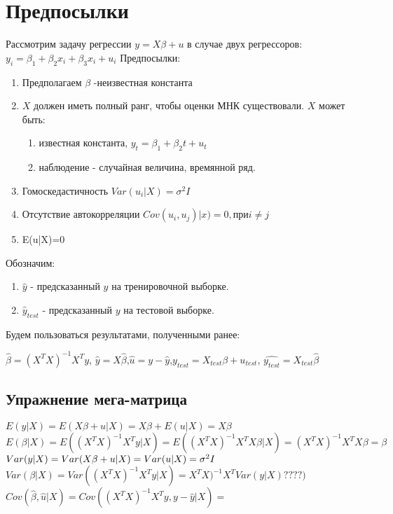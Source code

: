 \documentclass[12pt]{article} %
\theoremstyle{definition} %
\begin{document}
\section{Предпосылки}
Рассмотрим задачу регрессии $y=X\beta+u$ в случае двух регрессоров: $y_i=\beta_1+\beta_2x_i+\beta_3x_i+u_i$
Предпосылки:
\begin{enumerate}
    \item Предполагаем $\beta$ -неизвестная константа
    \item $X$ должен иметь полный ранг, чтобы оценки МНК существовали. $X$ может быть:
    \begin{enumerate}
        \item известная константа, $y_t=\beta_1+\beta_2t+u_t$
        \item наблюдение - случайная величина, времянной ряд.
    \end{enumerate}
    \item Гомоскедастичность ${Var}(u_i|X)=\sigma^2I$
    \item Отсутствие автокорреляции
    ${Cov}(u_i,u_j)|x)=0, при i\neq j$
    \item {E}(u|X)=0
\end{enumerate}
Обозначим:
\begin{enumerate}
    \item $\hat{y}$ - предсказанный $y$ на тренировочной выборке.
    \item $\hat{y}_{test}$ - предсказанный $y$ на тестовой выборке.
\end{enumerate}
\newpage
Будем пользоваться результатами, полученными ранее:

$\hat\beta=(X^TX)^{-1}X^Ty$,
$\hat{y}=X\hat\beta$,$\hat{u}=y-\hat{y}$,$y_{test}=X_{test}\beta+u_{test}$,
$\hat{y_{test}}=X_{test}\hat{\beta}$
\subsection{Упражнение мега-матрица}
${E}(y|X)={E}(X\beta+u|X)=X\beta+{E}(u|X)=X\beta$\\
${E}(\beta|X)={E}((X^TX)^{-1}X^Ty|X)={E}((X^TX)^{-1}X^TX\beta|X)=(X^TX)^{-1}X^TX\beta=\beta$\\
${Var}(y|X)={Var}(X\beta+u|X)={Var}(u|X)=\sigma^2I\\$
${Var}(\beta|X)={Var}((X^TX)^{-1}X^Ty|X)=X^TX)^{-1}X^T{Var}(y|X)????)$\\
${Cov}(\hat{\beta},\hat{u}|X)={Cov}((X^TX)^{-1}X^Ty,y-\hat{y}|X)=$
\end{document}
